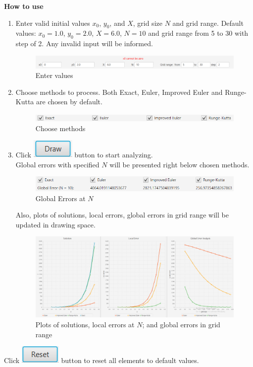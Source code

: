 \textbf{How to use}
\begin{enumerate}  
\item Enter valid initial values $x_0$, $y_0$, and $X$, grid size $N$ and grid range. Default values: $x_0=1.0$, $y_0=2.0$, $X=6.0$, $N=10$ and grid range from 5 to 30 with step of 2. Any invalid input will be informed.
\begin{figure}[H]
	\centering
	\includegraphics[width=0.8\linewidth]{image/error.png}
	\caption{Enter values}
	\label{fig:entervalues}
\end{figure}
\item Choose methods to process. Both Exact, Euler, Improved Euler and Runge-Kutta are chosen by default.
\begin{figure}[H]
	\centering
	\includegraphics[width=0.8\linewidth]{image/method.png}
	\caption{Choose methods}
	\label{fig:choosemethods}
\end{figure}
\item Click \includegraphics[height=2\fontcharht\font`\B]{image/draw.png} button to start analyzing. \\Global errors with specified $N$ will be presented right below chosen methods.
\begin{figure}[H]
	\centering
	\includegraphics[width=0.8\linewidth]{image/global.png}
	\caption{Global Errors at $N$}
	\label{fig:globalerror}
\end{figure}
Also, plots of solutions, local errors, global errors in grid range will be updated in drawing space.
\begin{figure}[H]
	\centering
	\includegraphics[width=\linewidth]{image/plot.png}
	\caption{Plots of solutions, local errors at $N$; and global errors in grid range}
	\label{fig:plot}
\end{figure}

\end{enumerate}
Click \includegraphics[height=2\fontcharht\font`\B]{image/reset.png} button to reset all elements to default values.

